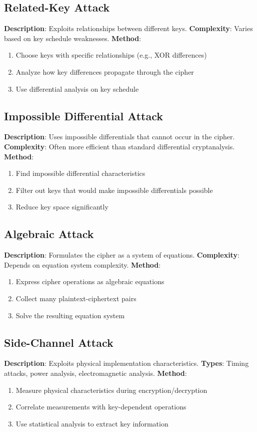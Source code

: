 \documentclass[11pt,a4paper]{article}
\begin{document}
\subsection{Related-Key Attack}
\textbf{Description}: Exploits relationships between different keys.
\textbf{Complexity}: Varies based on key schedule weaknesses.
\textbf{Method}:
\begin{enumerate}
    \item Choose keys with specific relationships (e.g., XOR differences)
    \item Analyze how key differences propagate through the cipher
    \item Use differential analysis on key schedule
\end{enumerate}

\subsection{Impossible Differential Attack}
\textbf{Description}: Uses impossible differentials that cannot occur in the cipher.
\textbf{Complexity}: Often more efficient than standard differential cryptanalysis.
\textbf{Method}:
\begin{enumerate}
    \item Find impossible differential characteristics
    \item Filter out keys that would make impossible differentials possible
    \item Reduce key space significantly
\end{enumerate}

\subsection{Algebraic Attack}
\textbf{Description}: Formulates the cipher as a system of equations.
\textbf{Complexity}: Depends on equation system complexity.
\textbf{Method}:
\begin{enumerate}
    \item Express cipher operations as algebraic equations
    \item Collect many plaintext-ciphertext pairs
    \item Solve the resulting equation system
\end{enumerate}

\subsection{Side-Channel Attack}
\textbf{Description}: Exploits physical implementation characteristics.
\textbf{Types}: Timing attacks, power analysis, electromagnetic analysis.
\textbf{Method}:
\begin{enumerate}
    \item Measure physical characteristics during encryption/decryption
    \item Correlate measurements with key-dependent operations
    \item Use statistical analysis to extract key information
\end{enumerate}
\end{document}
